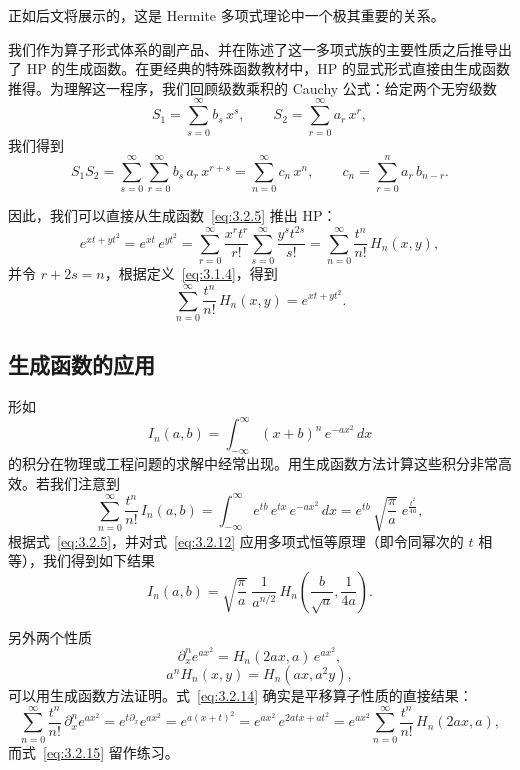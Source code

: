 \medskip
正如后文将展示的，这是 Hermite 多项式理论中一个极其重要的关系。

我们作为算子形式体系的副产品、并在陈述了这一多项式族的主要性质之后推导出了 HP 的生成函数。在更经典的特殊函数教材中，HP 的显式形式直接由生成函数推得。为理解这一程序，我们回顾级数乘积的 Cauchy 公式：给定两个无穷级数
\[
S_1=\sum_{s=0}^{\infty}b_s\,x^s,\qquad
S_2=\sum_{r=0}^{\infty}a_r\,x^r,
\]
我们得到
\[
S_1S_2=\sum_{s=0}^{\infty}\sum_{r=0}^{\infty}b_s\,a_r\,x^{r+s}
=\sum_{n=0}^{\infty}c_n\,x^n,\qquad
c_n=\sum_{r=0}^{n}a_r\,b_{n-r}.
\]

因此，我们可以直接从生成函数~\eqref{eq:3.2.5} 推出 HP：
\[
e^{xt+yt^2}=e^{xt}\,e^{yt^2}
=\sum_{r=0}^{\infty}\frac{x^r t^r}{r!}
 \sum_{s=0}^{\infty}\frac{y^s t^{2s}}{s!}
=\sum_{n=0}^{\infty}\frac{t^n}{n!}\,H_n(x,y),
\]
并令 $r+2s=n$，根据定义~\eqref{eq:3.1.4}，得到
\[
\sum_{n=0}^{\infty}\frac{t^n}{n!}\,H_n(x,y)
=e^{xt+yt^2}.
\]

\subsection{生成函数的应用}
\label{sec:3.2.2}

形如
\begin{equation}
I_n(a,b)=\int_{-\infty}^{\infty}(x+b)^n\,e^{-ax^2}\,dx
\label{eq:3.2.11}
\end{equation}
的积分在物理或工程问题的求解中经常出现。用生成函数方法计算这些积分非常高效。若我们注意到
\[
\sum_{n=0}^{\infty}\frac{t^n}{n!}\,I_n(a,b)
=\int_{-\infty}^{\infty}e^{tb}\,e^{tx}\,e^{-ax^2}\,dx
=e^{tb}\,\sqrt{\frac{\pi}{a}}\;e^{\frac{t^2}{4a}},
\label{eq:3.2.12}
\]
根据式~\eqref{eq:3.2.5}，并对式~\eqref{eq:3.2.12} 应用多项式恒等原理（即令同幂次的 $t$ 相等），我们得到如下结果
\begin{equation}
I_n(a,b)=\sqrt{\frac{\pi}{a}}\;\frac{1}{a^{n/2}}\,
H_n\!\left(\frac{b}{\sqrt{a}},\frac{1}{4a}\right).
\label{eq:3.2.13}
\end{equation}

另外两个性质
\begin{equation}
\partial_x^n e^{ax^2}=H_n(2ax,a)\,e^{ax^2},
\label{eq:3.2.14}
\end{equation}
\begin{equation}
a^n H_n(x,y)=H_n(ax,a^2y),
\label{eq:3.2.15}
\end{equation}
可以用生成函数方法证明。式~\eqref{eq:3.2.14} 确实是平移算子性质的直接结果：
\[
\sum_{n=0}^{\infty}\frac{t^n}{n!}\,\partial_x^n e^{ax^2}
=e^{t\partial_x}e^{ax^2}=e^{a(x+t)^2}
=e^{ax^2}\,e^{2atx+at^2}
=e^{ax^2}\sum_{n=0}^{\infty}\frac{t^n}{n!}\,H_n(2ax,a),
\]
而式~\eqref{eq:3.2.15} 留作练习。

